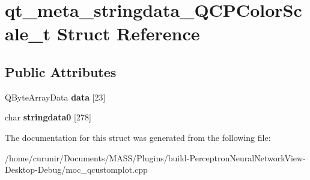 \hypertarget{structqt__meta__stringdata___q_c_p_color_scale__t}{}\section{qt\+\_\+meta\+\_\+stringdata\+\_\+\+Q\+C\+P\+Color\+Scale\+\_\+t Struct Reference}
\label{structqt__meta__stringdata___q_c_p_color_scale__t}
\subsection*{Public Attributes}
\begin{DoxyCompactItemize}
\item 
Q\+Byte\+Array\+Data {\bfseries data} \mbox{[}23\mbox{]}\hypertarget{structqt__meta__stringdata___q_c_p_color_scale__t_adbfbd7275c982d9d6c70985a35909562}{}\label{structqt__meta__stringdata___q_c_p_color_scale__t_adbfbd7275c982d9d6c70985a35909562}

\item 
char {\bfseries stringdata0} \mbox{[}278\mbox{]}\hypertarget{structqt__meta__stringdata___q_c_p_color_scale__t_a0ed4cd437d62f56ea375637ec624a59c}{}\label{structqt__meta__stringdata___q_c_p_color_scale__t_a0ed4cd437d62f56ea375637ec624a59c}

\end{DoxyCompactItemize}


The documentation for this struct was generated from the following file\+:\begin{DoxyCompactItemize}
\item 
/home/curunir/\+Documents/\+M\+A\+S\+S/\+Plugins/build-\/\+Perceptron\+Neural\+Network\+View-\/\+Desktop-\/\+Debug/moc\+\_\+qcustomplot.\+cpp\end{DoxyCompactItemize}
